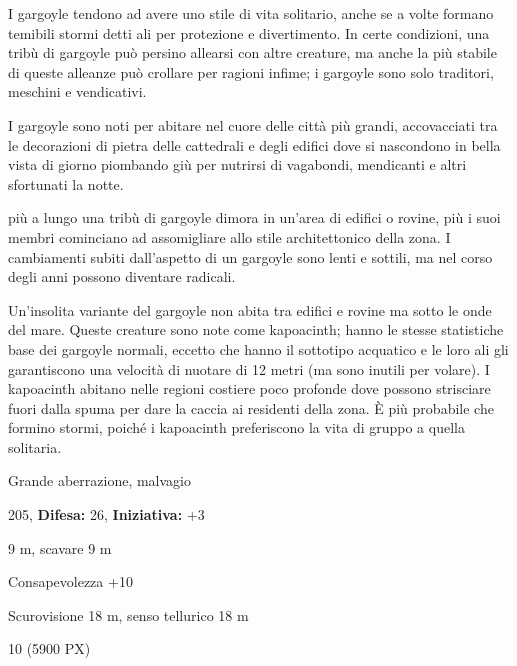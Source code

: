 \begin{multicols}{2}
{I gargoyle tendono ad avere uno stile di vita solitario, anche se a volte formano temibili stormi detti ali per protezione e divertimento. In certe condizioni, una tribù di gargoyle può persino allearsi con altre creature, ma anche la più stabile di queste alleanze può crollare per ragioni infime; i gargoyle sono solo traditori, meschini e vendicativi.

I gargoyle sono noti per abitare nel cuore delle città più grandi, accovacciati tra le decorazioni di pietra delle cattedrali e degli edifici dove si nascondono in bella vista di giorno piombando giù per nutrirsi di vagabondi, mendicanti e altri sfortunati la notte.

più a lungo una tribù di gargoyle dimora in un'area di edifici o rovine, più i suoi membri cominciano ad assomigliare allo stile architettonico della zona. I cambiamenti subiti dall'aspetto di un gargoyle sono lenti e sottili, ma nel corso degli anni possono diventare radicali.

Un'insolita variante del gargoyle non abita tra edifici e rovine ma sotto le onde del mare. Queste creature sono note come kapoacinth; hanno le stesse statistiche base dei gargoyle normali, eccetto che hanno il sottotipo acquatico e le loro ali gli garantiscono una velocità di nuotare di 12 metri (ma sono inutili per volare). I kapoacinth abitano nelle regioni costiere poco profonde dove possono strisciare fuori dalla spuma per dare la caccia ai residenti della zona. È più probabile che formino stormi, poiché i kapoacinth preferiscono la vita di gruppo a quella solitaria.

\noindent
\begin{description}[noitemsep, topsep=0pt, parsep=0pt, partopsep=0pt, leftmargin=0cm, labelwidth=2.2cm]
	\item[\textbf{Taglia/Tipo:}] Grande aberrazione, malvagio
	\item[\textbf{Caratt.:}] 
	\item[\textbf{Punti Ferita:}] 205,  \textbf{Difesa:} 26,  \textbf{Iniziativa:} +3
	\item[\textbf{Movimento:}] 9 m, scavare 9 m
	\item[\textbf{Tiri Salvez.:}] 
	\item[\textbf{Comp.:}] Consapevolezza +10
	\item[\textbf{Sensi:}] Scurovisione 18 m, senso tellurico 18 m
	\item[\textbf{Sfida:}] 10 (5900 PX)\smallskip
\end{description}

}
\end{multicols}
